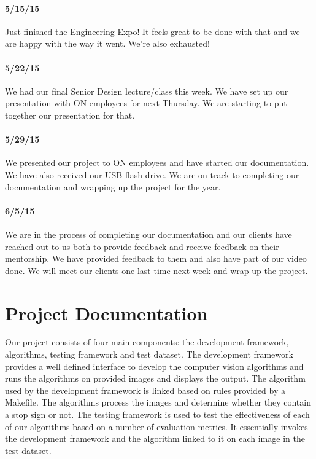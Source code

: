 \documentclass[letterpaper,10pt,titlepage]{article}
\begin{document}
    \paragraph*{5/15/15}
    Just finished the Engineering Expo! It feels great to be done with that 
    and we are happy with the way it went. We're also exhausted!
    \paragraph*{5/22/15}
    We had our final Senior Design lecture/class this week. We have set up our
    presentation with ON employees for next Thursday. We are starting to put 
    together our presentation for that. 
    \paragraph*{5/29/15}
    We presented our project to ON employees and have started our documentation.
    We have also received our USB flash drive. We are on track to completing
    our documentation and wrapping up the project for the year. 
    \paragraph*{6/5/15}
    We are in the process of completing our documentation and our clients have
    reached out to us both to provide feedback and receive feedback on their
    mentorship. We have provided feedback to them and also have part of our 
    video done. We will meet our clients one last time next week and wrap up
    the project.
\section*{Project Documentation}
Our project consists of four main components: the development framework, 
algorithms, testing framework and test dataset. The development framework
provides a well defined interface to develop the computer vision algorithms and
runs the algorithms on provided images and displays the output. The algorithm 
used by the development framework is linked based on rules provided by a 
Makefile. The algorithms process the images and determine whether they contain
a stop sign or not. The testing framework is used to test the effectiveness of
each of our algorithms based on a number of evaluation metrics. It essentially
invokes the development framework and the algorithm linked to it on each image
in the test dataset.
\end{document}
